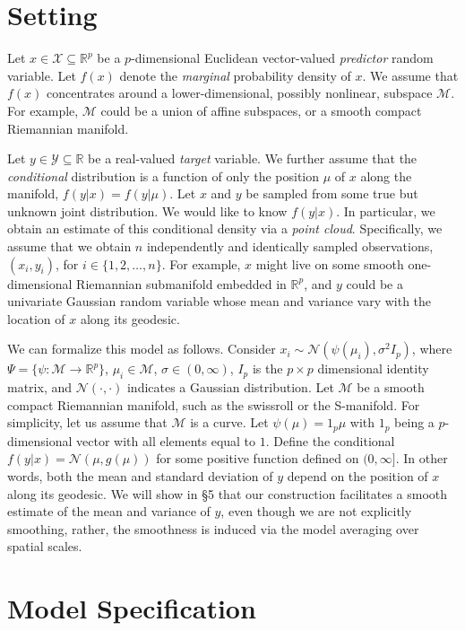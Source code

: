 \documentclass{article}
\newcommand{\Real}{\mathbb{R}}
\providecommand{\mc}[1]{\mathcal{#1}}
\newcommand{\from}{{\ensuremath{\colon}}}           %
\begin{document}
\section{Setting}
Let $x \in \mathcal{X} \subseteq \Real^p$ be a $p$-dimensional Euclidean vector-valued \emph{predictor} random variable.  Let $f(x)$ denote the \emph{marginal} probability density of $x$.  We assume that $f(x)$ concentrates around a lower-dimensional, possibly nonlinear, subspace $\mc{M}$.  For example, $\mc{M}$ could be a union of affine subspaces, or a smooth compact Riemannian manifold.  

Let $y \in  \mathcal{Y} \subseteq \Real$ be a real-valued \emph{target} variable. We further assume that the \emph{conditional} distribution is a function of only the position $\mu$ of $x$ along the manifold, $f(y|x)=f(y|\mu)$. Let $x$ and $y$ be sampled from some true but unknown joint distribution. We would like to know $f(y| x)$.  In particular, we obtain an estimate of this conditional density via a \emph{point cloud}.  Specifically, we assume that we obtain $n$ independently and identically sampled observations, $(x_i,y_i) $, for $i \in \{1,2,\ldots,n\}$.  For example, $x$ might live on some smooth one-dimensional Riemannian submanifold embedded in $\Real^p$, and  $y$ could be a univariate Gaussian random variable whose mean and variance vary with the location of $x$ along its geodesic.  

We can formalize this model as follows. Consider  $x_i \sim \mc{N}(\psi(\mu_i),\sigma^2 I_p)$, where $\Psi =\{ \psi \from \mc{M} \to \Real^p\}$, $\mu_i \in \mc{M}$, $\sigma \in (0,\infty)$, $I_p$ is the $p\times p$ dimensional identity matrix, and $\mc{N}(\cdot,\cdot)$ indicates a Gaussian distribution.  Let $\mc{M}$ be a smooth compact Riemannian manifold, such as the swissroll or the S-manifold. For simplicity, let us assume that $\mc{M}$ is a curve. Let $\psi(\mu)=1_p \mu$ with $1_p$ being a $p$-dimensional vector with all elements equal to $1$. Define the conditional $f(y|x) = \mc{N}( \mu, g(\mu))$ for some positive function defined on $(0,\infty]$. In other words, both the mean and standard deviation of $y$ depend on the position of $x$ along its geodesic. We will show in \S 5 that  our construction facilitates a smooth estimate of the mean and variance of $y$, even though we are not explicitly smoothing, rather, the smoothness is induced via the  model averaging over spatial scales.

\section{Model Specification} %
\label{sec:approach}
\end{document}
